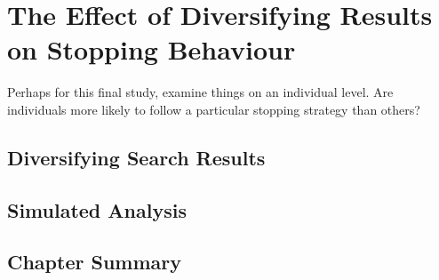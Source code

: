 
\chapter[The Effect of Diversifying Results on Stopping Behaviour]{The Effect of Diversifying Results\\on Stopping Behaviour}\label{chap:diversity}
Perhaps for this final study, examine things on an individual level. Are individuals more likely to follow a particular stopping strategy than others?

\section{Diversifying Search Results}

\section{Simulated Analysis}

\section{Chapter Summary}